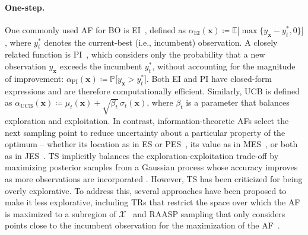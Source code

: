 \paragraph{One-step.} 
One commonly used \ac{AF} for \ac{BO} is \acf{EI}~\citep{jones1998efficient}, defined as $ \alpha_{\text{EI}}(\bm{x}) \coloneqq \mathbb{E}\bigl[\max\{y_{\bm{x}} - y_t^\ast, 0\}\bigr]$, where $y_t^\ast$ denotes the current-best (i.e., incumbent) observation. A closely related function is \ac{PI}~\citep{jones2001taxonomy}, which considers only the probability that a new observation $y_{\bm{x}}$ exceeds the incumbent $y_t^\ast$, without accounting for the magnitude of improvement: $ \alpha_{\text{PI}}(\bm{x}) \coloneqq \mathbb{P}\bigl[y_{\bm{x}} > y_t^\ast\bigr]$. Both \ac{EI} and \ac{PI} have closed-form expressions and are therefore computationally efficient. Similarly, \ac{UCB} is defined as $ \alpha_{\text{UCB}}(\bm{x}) \coloneqq \mu_t(\bm{x}) + \sqrt{\beta_t}\,\sigma_t(\bm{x})$, where $\beta_t$ is a parameter that balances exploration and exploitation. In contrast, information-theoretic \acp{AF} select the next sampling point to reduce uncertainty about a particular property of the optimum -- whether its location as in \ac{ES} or \ac{PES}~\citep{hennig2012entropy, hernandez2014predictive}, its value as in \ac{MES}~\citep{wang2017max}, or both as in \ac{JES}~\citep{hvarfner2022joint, tu2022joint}. 
\ac{TS} implicitly balances the exploration-exploitation trade-off by maximizing posterior samples from a Gaussian process whose accuracy improves as more observations are incorporated \citep{bijl2016sequential}. However, \ac{TS} has been criticized for being overly explorative.
To address this, several approaches have been proposed to make it less explorative, including \acp{TR} that restrict the space over which the \ac{AF} is maximized to a subregion of $\mathcal{X}$~\citep{eriksson2019scalable} and \ac{RAASP} sampling that only considers points close to the incumbent observation for the maximization of the \ac{AF}~\citep{rashidi2024cylindrical}.

